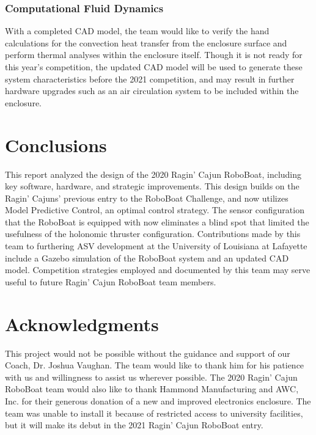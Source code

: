 \documentclass[letterpaper, 12 pt, conference]{ieeeconf}
\begin{document}
\subsubsection{Computational Fluid Dynamics}
With a completed CAD model, the team would like to verify the hand calculations for the convection heat transfer from the enclosure surface and perform thermal analyses within the enclosure itself. Though it is not ready for this year's competition, the updated CAD model will be used to generate these system characteristics before the 2021 competition, and may result in further hardware upgrades such as an air circulation system to be included within the enclosure.

\section{Conclusions}
This report analyzed the design of the 2020 Ragin' Cajun RoboBoat, including key software, hardware, and strategic improvements. This design builds on the Ragin' Cajuns' previous entry to the RoboBoat Challenge, and now utilizes Model Predictive Control, an optimal control strategy. The sensor configuration that the RoboBoat is equipped with now eliminates a blind spot that limited the usefulness of the holonomic thruster configuration. Contributions made by this team to furthering ASV development at the University of Louisiana at Lafayette include a Gazebo simulation of the RoboBoat system and an updated CAD model. Competition strategies employed and documented by this team may serve useful to future Ragin' Cajun RoboBoat team members.

\section{Acknowledgments}
This project would not be possible without the guidance and support of our Coach, Dr. Joshua Vaughan. The team would like to thank him for his patience with us and willingness to assist us wherever possible. The 2020 Ragin' Cajun RoboBoat team would also like to thank Hammond Manufacturing and AWC, Inc. for their generous donation of a new and improved electronics enclosure. The team was unable to install it because of restricted access to university facilities, but it will make its debut in the 2021 Ragin' Cajun RoboBoat entry.


\end{document}
